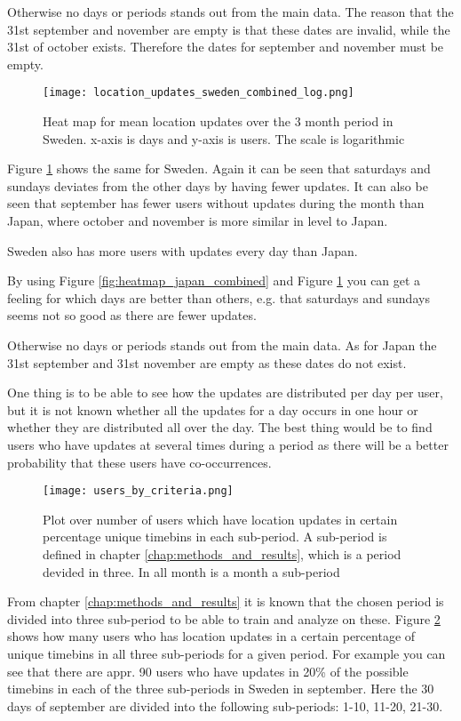 Otherwise no days or periods stands out from the main data. The reason that the 31st september and november are empty is that these dates are invalid, while the 31st of october exists. Therefore the dates for september and november must be empty.  

\begin{figure}[H]
    \hspace*{-1.5cm}
    \centering
    \texttt{[image: location\_updates\_sweden\_combined\_log.png]}
    \caption{Heat map for mean location updates over the 3 month period in Sweden. x-axis is days and y-axis is users. The scale is logarithmic}
    \label{fig:heatmap_sweden_combined}
\end{figure}
Figure \ref{fig:heatmap_sweden_combined} shows the same for Sweden. Again it can be seen that saturdays and sundays deviates from the other days by having fewer updates. It can also be seen that september has fewer users without updates during the month than Japan, where october and november is more similar in level to Japan. 

Sweden also has more users with updates every day than Japan. 

By using Figure \ref{fig:heatmap_japan_combined} and Figure \ref{fig:heatmap_sweden_combined} you can get a feeling for which days are better than others, e.g. that saturdays and sundays seems not so good as there are fewer updates. 

Otherwise no days or periods stands out from the main data. As for Japan the 31st september and 31st november are empty as these dates do not exist.  

One thing is to be able to see how the updates are distributed per day per user, but it is not known whether all the updates for a day occurs in one hour or whether they are distributed all over the day. The best thing would be to find users who have updates at several times during a period as there will be a better probability that these users have co-occurrences.  


\begin{figure}[H]
    \hspace*{-2.0cm}
    \centering
    \texttt{[image: users\_by\_criteria.png]}
    \caption{Plot over number of users which have location updates in certain percentage unique timebins in each sub-period. A sub-period is defined in chapter \ref{chap:methods_and_results}, which is a period devided in three. In all month is a month a sub-period}
    \label{fig:users_by_criteria}
\end{figure}
From chapter \ref{chap:methods_and_results} it is known that the chosen period is divided into three sub-period to be able to train and analyze on these. Figure \ref{fig:users_by_criteria} shows how many users who has location updates in a certain percentage of unique timebins in all three sub-periods for a given period. For example you can see that there are appr. 90 users who have updates in 20\% of the possible timebins in each of the three sub-periods in Sweden in september. Here the 30 days of september are divided into the following sub-periods: 1-10, 11-20, 21-30. 

